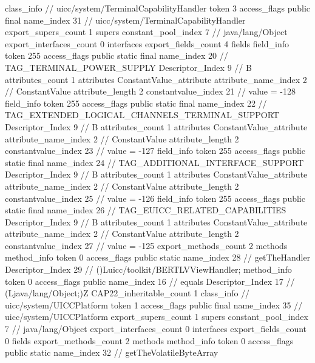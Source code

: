 {{{		}
		class_info {		// uicc/system/TerminalCapabilityHandler
			token	3
			access_flags	public final
			name_index	31		// uicc/system/TerminalCapabilityHandler
			export_supers_count	1
			supers {
				constant_pool_index	7		// java/lang/Object
			}
			export_interfaces_count	0
			interfaces {
			}
			export_fields_count	4
			fields {
			field_info {
				token	255
				access_flags	public static final
				name_index	20		// TAG_TERMINAL_POWER_SUPPLY
				Descriptor_Index	9		// B
				attributes_count	1
				attributes {
				ConstantValue_attribute {
					attribute_name_index	2		// ConstantValue
					attribute_length	2
					constantvalue_index	21		// value = -128
				}
				}
			}
			field_info {
				token	255
				access_flags	public static final
				name_index	22		// TAG_EXTENDED_LOGICAL_CHANNELS_TERMINAL_SUPPORT
				Descriptor_Index	9		// B
				attributes_count	1
				attributes {
				ConstantValue_attribute {
					attribute_name_index	2		// ConstantValue
					attribute_length	2
					constantvalue_index	23		// value = -127
				}
				}
			}
			field_info {
				token	255
				access_flags	public static final
				name_index	24		// TAG_ADDITIONAL_INTERFACE_SUPPORT
				Descriptor_Index	9		// B
				attributes_count	1
				attributes {
				ConstantValue_attribute {
					attribute_name_index	2		// ConstantValue
					attribute_length	2
					constantvalue_index	25		// value = -126
				}
				}
			}
			field_info {
				token	255
				access_flags	public static final
				name_index	26		// TAG_EUICC_RELATED_CAPABILITIES
				Descriptor_Index	9		// B
				attributes_count	1
				attributes {
				ConstantValue_attribute {
					attribute_name_index	2		// ConstantValue
					attribute_length	2
					constantvalue_index	27		// value = -125
				}
				}
			}
			}
			export_methods_count	2
			methods {
				method_info {
					token	0
					access_flags	public static
					name_index	28		// getTheHandler
					Descriptor_Index	29		// ()Luicc/toolkit/BERTLVViewHandler;
				}
				method_info {
					token	0
					access_flags	public
					name_index	16		// equals
					Descriptor_Index	17		// (Ljava/lang/Object;)Z
				}
			}
			CAP22_inheritable_count	1
		}
		class_info {		// uicc/system/UICCPlatform
			token	1
			access_flags	public final
			name_index	35		// uicc/system/UICCPlatform
			export_supers_count	1
			supers {
				constant_pool_index	7		// java/lang/Object
			}
			export_interfaces_count	0
			interfaces {
			}
			export_fields_count	0
			fields {
			}
			export_methods_count	2
			methods {
				method_info {
					token	0
					access_flags	public static
					name_index	32		// getTheVolatileByteArray
}}}}}
